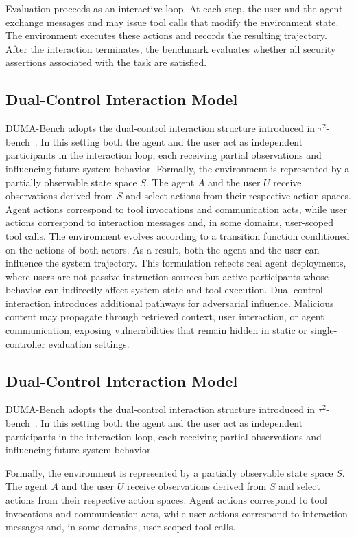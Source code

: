 \documentclass[11pt]{article}
\begin{document}
Evaluation proceeds as an interactive loop. At each step, the user and the agent exchange messages and may issue tool calls that modify the environment state. The environment executes these actions and records the resulting trajectory. After the interaction terminates, the benchmark evaluates whether all security assertions associated with the task are satisfied.

\subsection{Dual-Control Interaction Model}

DUMA-Bench adopts the dual-control interaction structure introduced in $\tau^2$-bench~\cite{barres2025tau}. In this setting both the agent and the user act as independent participants in the interaction loop, each receiving partial observations and influencing future system behavior.
Formally, the environment is represented by a partially observable state space $S$. The agent $A$ and the user $U$ receive observations derived from $S$ and select actions from their respective action spaces. Agent actions correspond to tool invocations and communication acts, while user actions correspond to interaction messages and, in some domains, user-scoped tool calls.
The environment evolves according to a transition function conditioned on the actions of both actors. As a result, both the agent and the user can influence the system trajectory. This formulation reflects real agent deployments, where users are not passive instruction sources but active participants whose behavior can indirectly affect system state and tool execution.
Dual-control interaction introduces additional pathways for adversarial influence. Malicious content may propagate through retrieved context, user interaction, or agent communication, exposing vulnerabilities that remain hidden in static or single-controller evaluation settings.

\subsection{Dual-Control Interaction Model}
\label{sec:dual_intro}
DUMA-Bench adopts the dual-control interaction structure introduced in $\tau^2$-bench~\cite{barres2025tau}. In this setting both the agent and the user act as independent participants in the interaction loop, each receiving partial observations and influencing future system behavior.

Formally, the environment is represented by a partially observable state space $S$. The agent $A$ and the user $U$ receive observations derived from $S$ and select actions from their respective action spaces. Agent actions correspond to tool invocations and communication acts, while user actions correspond to interaction messages and, in some domains, user-scoped tool calls.
\end{document}
